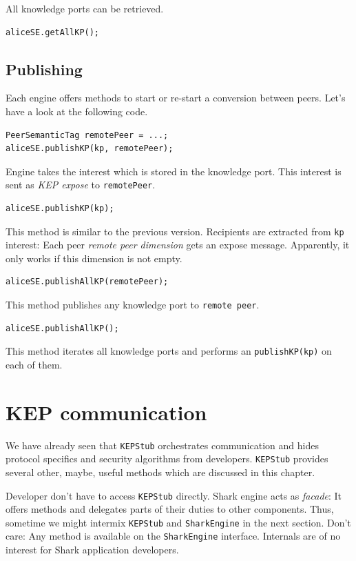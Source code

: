 All knowledge ports can be retrieved.
\begin{verbatim}
aliceSE.getAllKP();
\end{verbatim}

\subsection{Publishing}
Each engine offers methods to start or re-start a conversion between peers.
Let's have a look at the following code.

\begin{verbatim}
PeerSemanticTag remotePeer = ...;
aliceSE.publishKP(kp, remotePeer);
\end{verbatim}

Engine takes the interest which is stored in the knowledge port. This interest is sent as {\it KEP expose} to {\tt remotePeer}.

\begin{verbatim}
aliceSE.publishKP(kp);
\end{verbatim}

This method is similar to the previous version. Recipients are extracted from {\tt kp} interest: Each peer {\it remote peer dimension} gets an expose message.
Apparently, it only works if this dimension is not empty.

\begin{verbatim}
aliceSE.publishAllKP(remotePeer);
\end{verbatim}

This method publishes any knowledge port to {\tt remote peer}.

\begin{verbatim}
aliceSE.publishAllKP();
\end{verbatim}

This method iterates all knowledge ports and performs an {\tt publishKP(kp)} on each of them.

\section{KEP communication}
\label{ref:sec:KEP}
We have already seen that {\tt KEPStub} orchestrates communication and hides protocol specifics and security algorithms from developers. {\tt KEPStub} provides several other, maybe, useful methods which are discussed in this chapter. 

Developer don't have to access {\tt KEPStub} directly. Shark engine acts as {\it facade}: It offers methods and delegates parts of their duties to other components. Thus, sometime we might intermix {\tt KEPStub} and {\tt SharkEngine} in the next section. Don't care: Any method is available on the {\tt SharkEngine} interface. Internals are of no interest for Shark application developers.

